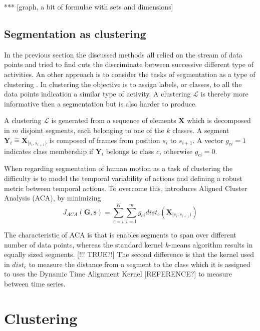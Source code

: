*** [graph, a bit of formulae with sets and dimensions]

\subsection{Segmentation as clustering}
In the previous section the discussed methods all relied on the stream of data 
points and tried to find cuts the discriminate between successive different 
type of activities. An other approach is to consider the tasks of segmentation 
as a type of clustering \cite{zhou2008aligned}. In clustering the objective is 
to assign labels, or classes, to all the data points indication a similar type 
of activity. A clustering $\mathcal{L}$ is thereby more informative then a 
segmentation but is also harder to produce.

A clustering $\mathcal{L}$ is generated from a sequence of elements 
$\mathbf{X}$ which is decomposed in $m$ disjoint segments, each belonging to 
one of the $k$ classes. A segment $\mathbf{Y}_i \hat{=} 
\mathbf{X}_{[s_i,s_{i+1})}$ is composed of frames from position $s_i$ to 
$s_{i+1}$. A vector $g_{ci} = 1$ indicates class membership if $\mathbf{Y}_i$ 
belongs to class $c$, otherwise $g_{ci} = 0$.

When regarding segmentation of human motion as a task of clustering the 
difficulty is to model the temporal variability of actions 
and defining a robust metric between temporal actions. To overcome this, 
\cite{zhou2008aligned} introduces Aligned Cluster Analysis (ACA), by minimizing
\begin{equation} \label{eq:ACA}
J_{\mathit{ACA}}(\mathbf{G},\mathbf{s}) = 
\sum_{c=i}^{K} \sum_{i=1}^{m} g_{ci} \mathit{dist}_c 
(\mathbf{X}_{[s_i,s_{i+1})})
\end{equation}

The characteristic of ACA is that is enables segments to span over different 
number of data points, whereas the standard kernel $k$-means algorithm results 
in equally sized segments. [!!! TRUE?!] The second difference is that the 
kernel used in $\mathit{dist}_c$ to measure the distance from a segment to the 
class which it is assigned to uses the Dynamic Time Alignment Kernel 
[REFERENCE?] to measure between time series.


\section{Clustering}

